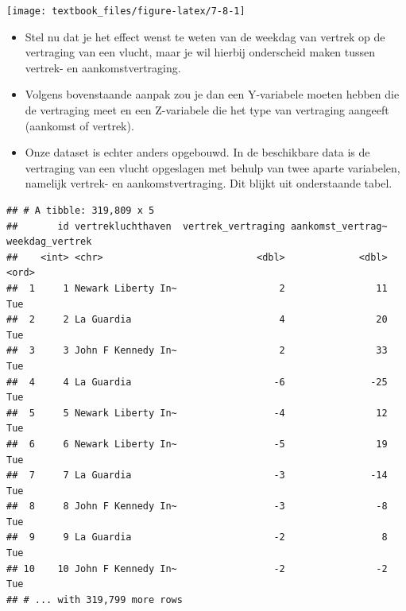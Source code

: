 \documentclass[]{tufte-book}
\newenvironment{Shaded}{}{}
\newcommand{\KeywordTok}[1]{\textcolor[rgb]{0.00,0.44,0.13}{\textbf{#1}}}
\newcommand{\NormalTok}[1]{#1}
\newcommand{\OperatorTok}[1]{\textcolor[rgb]{0.40,0.40,0.40}{#1}}
\newcommand{\StringTok}[1]{\textcolor[rgb]{0.25,0.44,0.63}{#1}}
\providecommand{\tightlist}{%
  \setlength{\itemsep}{0pt}\setlength{\parskip}{0pt}}
\begin{document}
\texttt{[image: textbook\_files/figure-latex/7-8-1]}

\begin{itemize}
\tightlist
\item
  Stel nu dat je het effect wenst te weten van de weekdag van vertrek op de vertraging van een vlucht, maar je wil hierbij onderscheid maken tussen vertrek- en aankomstvertraging.
\item
  Volgens bovenstaande aanpak zou je dan een Y-variabele moeten hebben die de vertraging meet en een Z-variabele die het type van vertraging aangeeft (aankomst of vertrek).
\item
  Onze dataset is echter anders opgebouwd. In de beschikbare data is de vertraging van een vlucht opgeslagen met behulp van twee aparte variabelen, namelijk vertrek- en aankomstvertraging. Dit blijkt uit onderstaande tabel.
\end{itemize}

\begin{Shaded}
\end{Shaded}

\begin{verbatim}
## # A tibble: 319,809 x 5
##       id vertrekluchthaven  vertrek_vertraging aankomst_vertrag~ weekdag_vertrek
##    <int> <chr>                           <dbl>             <dbl> <ord>          
##  1     1 Newark Liberty In~                  2                11 Tue            
##  2     2 La Guardia                          4                20 Tue            
##  3     3 John F Kennedy In~                  2                33 Tue            
##  4     4 La Guardia                         -6               -25 Tue            
##  5     5 Newark Liberty In~                 -4                12 Tue            
##  6     6 Newark Liberty In~                 -5                19 Tue            
##  7     7 La Guardia                         -3               -14 Tue            
##  8     8 John F Kennedy In~                 -3                -8 Tue            
##  9     9 La Guardia                         -2                 8 Tue            
## 10    10 John F Kennedy In~                 -2                -2 Tue            
## # ... with 319,799 more rows
\end{verbatim}
\end{document}

